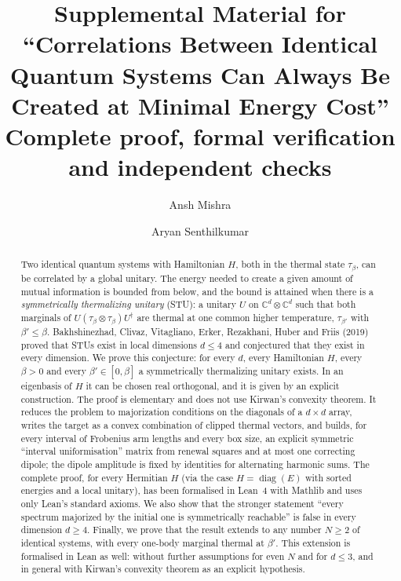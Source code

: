 \documentclass[11pt]{amsart}
\theoremstyle{definition}
\theoremstyle{remark}
\numberwithin{equation}{section}
\newcommand{\C}{\mathbb{C}}
\newcommand{\diag}{\operatorname{diag}}
\begin{document}
\title[Supplemental Material]{Supplemental Material for\\ ``Correlations Between Identical Quantum Systems Can
Always Be Created at Minimal Energy Cost''\\[4pt] \normalsize Complete proof, formal verification and independent checks}

\author{Ansh Mishra}
\address{Independent researcher, Cumming, GA, USA}
\author{Aryan Senthilkumar}
\address{Independent researcher, Johns Creek, GA, USA}


\begin{abstract}
Two identical quantum systems with Hamiltonian $H$, both in the thermal state $\tau_\beta$, can be
correlated by a global unitary. The energy needed to create a given amount of mutual information is
bounded from below, and the bound is attained when there is a \emph{symmetrically thermalizing
unitary} (STU): a unitary $U$ on $\C^d\otimes\C^d$ such that both marginals of
$U(\tau_\beta\otimes\tau_\beta)U^\dagger$ are thermal at one common higher temperature,
$\tau_{\beta'}$ with $\beta'\le\beta$. Bakhshinezhad, Clivaz, Vitagliano, Erker, Rezakhani, Huber and
Friis (2019) proved that STUs exist in local dimensions $d\le 4$ and conjectured that they exist in
every dimension. We prove this conjecture: for every $d$, every Hamiltonian $H$, every $\beta>0$ and
every $\beta'\in[0,\beta]$ a symmetrically thermalizing unitary exists. In an eigenbasis of $H$ it can
be chosen real orthogonal, and it is given by an explicit construction. The proof is elementary and
does not use Kirwan's convexity theorem. It reduces the problem to majorization conditions on the
diagonals of a $d\times d$ array, writes the target as a convex combination of clipped thermal
vectors, and builds, for every interval of Frobenius arm lengths and every box size, an explicit symmetric
``interval uniformisation'' matrix from renewal squares and at most one correcting dipole; the
dipole amplitude is fixed by identities for alternating harmonic sums. The complete proof, for
every Hermitian $H$ (via the case $H=\diag(E)$ with sorted energies and a local unitary), has been
formalised in Lean~4 with Mathlib and uses only Lean's standard axioms. We also show that the
stronger statement ``every spectrum majorized by the initial one is symmetrically reachable'' is
false in every dimension $d\ge 4$. Finally, we prove that the result extends to any number $N\ge2$ of identical
systems, with every one-body marginal thermal at $\beta'$. This extension is formalised in Lean as well: without
further assumptions for even $N$ and for $d\le3$, and in general with Kirwan's convexity theorem as an explicit
hypothesis.
\end{abstract}
\end{document}
